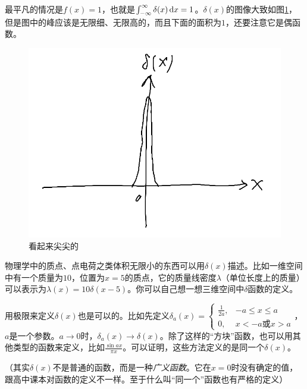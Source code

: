 最平凡的情况是$f(x)=1$，也就是$\int_{-\infty}^{\infty} \delta(x) \mathop{}\!\mathrm{d} x=1$。$\delta(x)$的图像大致如图\ref{fig-delta-x}，但是图中的峰应该是无限细、无限高的，而且下面的面积为$1$，还要注意它是偶函数。
\begin{figure}[htb]
\centering
\includegraphics[scale=0.5]{fig/delta-x.png}
\caption{看起来尖尖的}
\label{fig-delta-x}
\end{figure}

物理学中的质点、点电荷之类体积无限小的东西可以用$\delta(x)$描述。比如一维空间中有一个质量为$10$，位置为$x=5$的质点，它的质量线密度$\lambda$（单位长度上的质量）可以表示为$\lambda(x)=10 \delta(x-5)$。你可以自己想一想三维空间中$\delta$函数的定义。

用极限来定义$\delta(x)$也是可以的。比如先定义$\delta_a(x)=\begin{cases} \frac{1}{2 a}, &-a \le x \le a \\ 0, &x<-a \text{或} x>a \end{cases}$，$a$是一个参数。$a \rightarrow 0$时，$\delta_a(x) \rightarrow \delta(x)$。除了这样的“方块”函数，也可以用其他类型的函数来定义，比如$\frac{\sin a x}{\pi x}$。可以证明，这些方法定义的是同一个$\delta(x)$。

（其实$\delta(x)$不是普通的函数，而是一种\emph{广义函数}。它在$x=0$时没有确定的值，跟高中课本对函数的定义不一样。至于什么叫“同一个”函数也有严格的定义）

